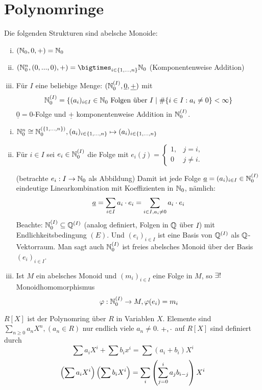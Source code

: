 \documentclass[a4paper]{report}
\begin{document}
\section{Polynomringe}
\begin{bsp}
  Die folgenden Strukturen sind abelsche Monoide:
  \begin{enumerate}[(i)]
    \item $(\mathbb{N}_0, 0, +) = \mathbb{N}_0$
    \item $(\Nn^{n}, (0,...,0), +) = \bigtimes_{i \in \eb n} \Nn$ (Komponentenweise Addition)
    \item Für $I$ eine beliebige Menge:
          \((\mathbb{N}_0^{(I)}, \underline 0, \underline +)\) mit
          \[\mathbb{N}_0^{(I)}= \{(a_{i})_{i \in I} \in \mathbb{N}_0 \text{ Folgen über }I \mid \#\{i \in I : a_{i} \ne 0\} < \infty\}\]
          $\underline 0 = 0$-Folge und $\underline +$ komponentenweise Addition in $\mathbb{N}_0^{(I)}$.
  \end{enumerate}
\end{bsp}
\begin{facts}[Übung]\item
\begin{enumerate}[(i)]
  \item $\mathbb{N}_0^{n} \cong \mathbb{N}_0^{(\{1, \ldots, n\})}, (a_{i})_{i \in \{1, \ldots, n\}} \mapsto (a_{i})_{i \in \{1, \ldots, n\}}$
  \item Für $i \in I$ sei $e_{i} \in \mathbb{N}_0^{(I)}$ die Folge mit $e_{i}(j) =
        \begin{cases}
          1, & j = i, \\ 0 & j \ne i.
        \end{cases}$

        (betrachte $e_{i} : I \to \mathbb{N}_0$ als Abbildung) Damit ist jede Folge $\underline a = (a_{i})_{i \in I} \in \mathbb{N}_0^{(I)}$ eindeutige Linearkombination mit Koeffizienten in $\mathbb{N}_0$, nämlich:
        \[\underline a = \sum_{i \in I}a_{i} \cdot e_{i} = \sum_{i \in I, a_{i} \ne 0}a_{i} \cdot e_{i}\]
        Beachte: $\mathbb{N}_0^{(I)} \subseteq \mathbb{Q}^{(I)}$ (analog definiert, Folgen in $\mathbb{Q}$ über $I$) mit Endlichkeitsbedingung $(E)$. Und $(e_{i})_{i \in I}$ ist eine Basis von $\mathbb{Q}^{(I)}$ als $\mathbb{Q}$-Vektorraum. Man sagt auch $\mathbb{N}_0^{(I)}$ ist freies abelsches Monoid über der Basis $(e_{i})_{i \in I}$.
    \item Ist $M$ ein abelsches Monoid und $(m_{i})_{i \in I}$ eine Folge in $M$, so $\exists!$ Monoidhomomorphismus \[\varphi: \mathbb{N}_0^{(I)} \to M, \varphi(e_{i}) = m_{i}\]
\end{enumerate}
\end{facts}

\begin{whg*}
  $R[X]$ ist der Polynomring über $R$ in Variablen $X$. Elemente sind $\sum_{n \ge 0} a_{n}X^{n}, (a_{n} \in R)$ nur endlich viele $a_{n} \ne 0$. $+, \cdot$ auf $R[X]$ sind definiert durch
  \[\sum a_{i}X^{i} + \sum b_{i}x^{i} = \sum(a_{i}+b_{i})X^{i}\]
  \[\left(\sum a_{i}X^{i}\right)\left(\sum b_{i}X^{i}\right) = \sum_{i}\left(\sum_{j=0}^{i}a_{j}b_{i-j}\right)X^{i}\]
\end{whg*}
\end{document}

